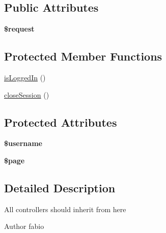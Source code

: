 \subsection*{Public Attributes}
\begin{DoxyCompactItemize}
\item 
\hypertarget{classController_ae09902e0cf33dbffd52349e056794842}{{\bfseries \$request}}\label{classController_ae09902e0cf33dbffd52349e056794842}

\end{DoxyCompactItemize}
\subsection*{Protected Member Functions}
\begin{DoxyCompactItemize}
\item 
\hyperlink{classController_a014e1cea4dd7e6fb8fad83cdce9c6216}{is\+Logged\+In} ()
\item 
\hyperlink{classController_a67beb590eef4f36b07e6c9ef04fc8337}{close\+Session} ()
\end{DoxyCompactItemize}
\subsection*{Protected Attributes}
\begin{DoxyCompactItemize}
\item 
\hypertarget{classController_add0ea4a4a72b2f7cf707bdd435a67c61}{{\bfseries \$username}}\label{classController_add0ea4a4a72b2f7cf707bdd435a67c61}

\item 
\hypertarget{classController_a82584774d202d57e2e5159fa2add1079}{{\bfseries \$page}}\label{classController_a82584774d202d57e2e5159fa2add1079}

\end{DoxyCompactItemize}


\subsection{Detailed Description}
All controllers should inherit from here

\begin{DoxyAuthor}{Author}
fabio 
\end{DoxyAuthor}


